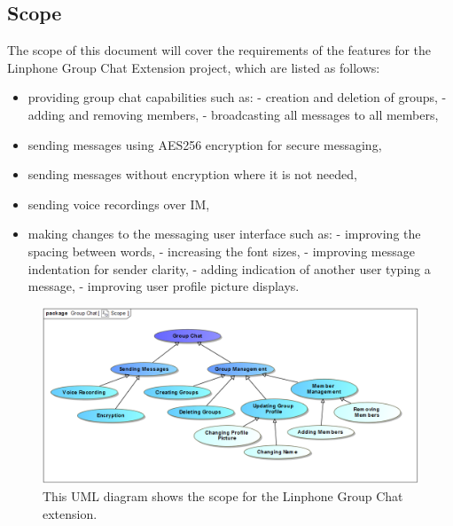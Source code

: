 \documentclass[11pt]{article}
\begin{document}
\subsection{Scope}
The scope of this document will cover the requirements of the features for the Linphone Group Chat Extension project, which are listed as follows:
\begin{itemize}
\item providing group chat capabilities such as:
\subitem  - creation and deletion of groups,
\subitem  - adding and removing members,
\subitem  - broadcasting all messages to all members,
\item sending messages using AES256 encryption for secure messaging,
\item sending messages without encryption where it is not needed,
\item sending voice recordings over IM,
\item making changes to the messaging user interface such as:
\subitem  - improving the spacing between words,
\subitem  - increasing the font sizes,
\subitem  - improving message indentation for sender clarity,
\subitem  - adding indication of another user typing a message,
\subitem  - improving user profile picture displays.
\end{itemize}
\begin{figure}[H]
\centering
\includegraphics[width=5in]{./images/scope_master.png}
\caption[Group Chat Extension Scope]{This UML diagram shows the scope for the Linphone Group Chat extension.}
\label{figure-scope-master}
\end{figure}
\end{document}
